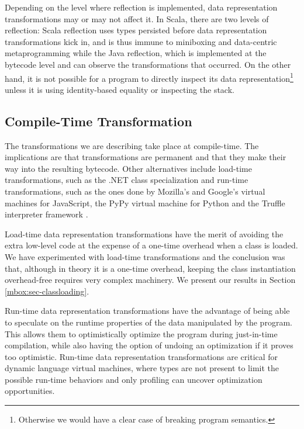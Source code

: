 Depending on the level where reflection is implemented, data representation transformations may or may not affect it. In Scala, there are two levels of reflection: Scala reflection uses types persisted before data representation transformations kick in, and is thus immune to miniboxing and data-centric metaprogramming while the Java reflection, which is implemented at the bytecode level and can observe the transformations that occurred. On the other hand, it is not possible for a program to directly inspect its data representation\footnote{Otherwise we would have a clear case of breaking program semantics.} unless it is using identity-based equality or inspecting the stack.

\subsection{Compile-Time Transformation}

The transformations we are describing take place at compile-time. The implications are that transformations are permanent and that they make their way into the resulting bytecode. Other alternatives include load-time transformations, such as the .NET class specialization \cite{dot-net-generics} and run-time transformations, such as the ones done by Mozilla's \cite{tracemonkey} and Google's virtual machines for JavaScript, the PyPy virtual machine for Python\cite{bolz-pypy-tracing-jit} and the Truffle interpreter framework \cite{truffle}.

Load-time data representation transformations have the merit of avoiding the extra low-level code at the expense of a one-time overhead when a class is loaded. We have experimented with load-time transformations and the conclusion was that, although in theory it is a one-time overhead, keeping the class instantiation overhead-free requires very complex machinery. We present our results in Section \ref{mbox:sec-classloading}.

Run-time data representation transformations have the advantage of being able to speculate on the runtime properties of the data manipulated by the program. This allows them to optimistically optimize the program during just-in-time compilation, while also having the option of undoing an optimization if it proves too optimistic. Run-time data representation transformations are critical for dynamic language virtual machines, where types are not present to limit the possible run-time behaviors and only profiling can uncover optimization opportunities.


